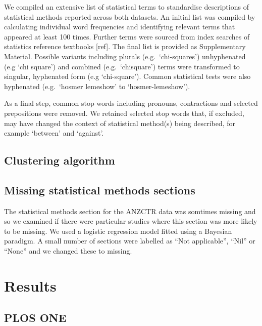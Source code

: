 \documentclass[
]{article}
\begin{document}
We compiled an extensive list of statistical terms to standardise
descriptions of statistical methods reported across both datasets. An
initial list was compiled by calculating individual word frequencies and
identifying relevant terms that appeared at least 100 times. Further
terms were sourced from index searches of statistics reference textbooks
{[}ref{]}. The final list is provided as Supplementary Material.
Possible variants including plurals (e.g.~`chi-squares') unhyphenated
(e.g `chi square') and combined (e.g.~`chisquare') terms were
transformed to singular, hyphenated form (e.g `chi-square'). Common
statistical tests were also hyphenated (e.g.~`hosmer lemeshow' to
`hosmer-lemeshow').

As a final step, common stop words including pronouns, contractions and
selected prepositions were removed. We retained selected stop words
that, if excluded, may have changed the context of statistical method(s)
being described, for example `between' and `against'.

\hypertarget{clustering-algorithm}{%
\subsection{Clustering algorithm}\label{clustering-algorithm}}

\hypertarget{missing-statistical-methods-sections}{%
\subsection{Missing statistical methods
sections}\label{missing-statistical-methods-sections}}

The statistical methods section for the ANZCTR data was somtimes missing
and so we examined if there were particular studies where this section
was more likely to be missing. We used a logistic regression model
fitted using a Bayesian paradigm. A small number of sections were
labelled as ``Not applicable'', ``Nil'' or ``None'' and we changed these
to missing.

\hypertarget{results}{%
\section{Results}\label{results}}

\hypertarget{plos-one}{%
\subsection{PLOS ONE}\label{plos-one}}
\end{document}
